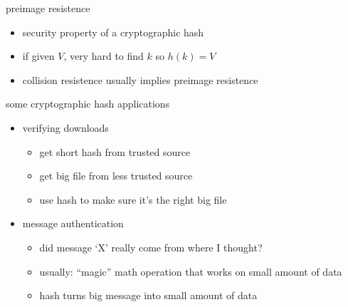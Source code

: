 
\begin{frame}{preimage resistence}
\begin{itemize}
\item security property of a cryptographic hash
\item if given $V$, very hard to find $k$ so $h(k) = V$
\item collision resistence usually implies preimage resistence
\end{itemize}
\end{frame}

\begin{frame}{some cryptographic hash applications}
    \begin{itemize}
    \item verifying downloads
        \begin{itemize}
        \item get short hash from trusted source
        \item get big file from less trusted source
        \item use hash to make sure it's the right big file
        \end{itemize}
    \item message authentication
        \begin{itemize}
        \item did message `X' really come from where I thought?
        \item usually: ``magic'' math operation that works on small amount of data
        \item hash turns big message into small amount of data
        \end{itemize}
    \end{itemize}
\end{frame}

